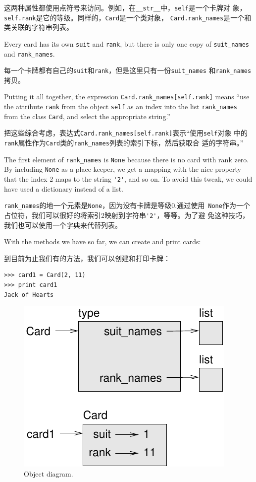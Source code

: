 \documentclass[10pt]{book}
\begin{document}
\begin{CJK}{UTF8}{gbsn}
这两种属性都使用点符号来访问。例如，在\verb"__str__"中，{\tt self}是一个卡牌对
象，{\tt self.rank}是它的等级。同样的，{\tt Card}是一个类对象，
\verb"Card.rank_names"是一个和类关联的字符串列表。

Every card has its own {\tt suit} and {\tt rank}, but there
is only one copy of \verb"suit_names" and \verb"rank_names".

每一个卡牌都有自己的{\tt suit}和{\tt rank}，但是这里只有一份\verb"suit_names"
和\verb"rank_names"拷贝。


Putting it all together, the expression
\verb"Card.rank_names[self.rank]" means ``use the attribute {\tt rank}
from the object {\tt self} as an index into the list \verb"rank_names"
from the class {\tt Card}, and select the appropriate string.''

把这些综合考虑，表达式\verb"Card.rank_names[self.rank]"表示``使用{\tt self}对象
中的{\tt rank}属性作为{\tt Card}类的\verb"rank_names"列表的索引下标，然后获取合
适的字符串。''

The first element of \verb"rank_names" is {\tt None} because there
is no card with rank zero.  By including {\tt None} as a place-keeper,
we get a mapping with the nice property that the index 2 maps to the
string \verb"'2'", and so on.  To avoid this tweak, we could have
used a dictionary instead of a list.

\verb"rank_names"的地一个元素是{\tt None}，因为没有卡牌是等级0.通过使用{\tt
None}作为一个占位符，我们可以很好的将索引2映射到字符串\verb"'2'"，等等。为了避
免这种技巧，我们也可以使用一个字典来代替列表。

With the methods we have so far, we can create and print cards:

到目前为止我们有的方法，我们可以创建和打印卡牌：

\begin{verbatim}
>>> card1 = Card(2, 11)
>>> print card1
Jack of Hearts
\end{verbatim}

\begin{figure}
\centerline
{\includegraphics[scale=0.8]{figs/card1.pdf}}
\caption{Object diagram.}
\label{fig.card1}
\end{figure}


\end{CJK}
\end{document}
